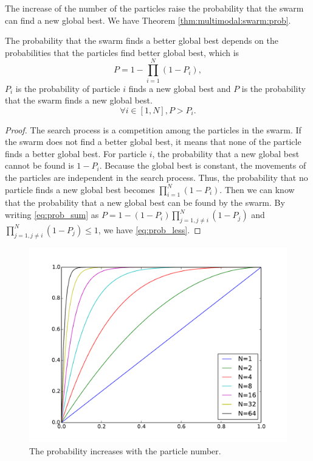 The increase of the number of the particles raise the probability that the swarm can find a new global best.
We have Theorem \ref{thm:multimodal:swarm:prob}.

\begin{mythm}
\label{thm:multimodal:swarm:prob}
The probability that the swarm finds a better global best depends on the probabilities that the particles find better global best, which is
\begin{equation}
\label{eq:prob_sum}
P = 1 - \prod_{i=1}^{N} ( 1 - P_{i} ),
\end{equation}
$ P_{i} $ is the probability of particle $ i $ finds a new global best
and $ P $ is the probability that the swarm finds a new global best.
\begin{equation}
\label{eq:prob_less}
\forall i \in [1, N], P > P_{i}.
\end{equation}
\begin{proof}
The search process is a competition among the particles in the swarm.
If the swarm does not find a better global best, it means that none of the particle finds a better global best.
For particle $ i $, the probability that a new global best cannot be found is $ 1 - P_{i} $.
Because the global best is constant, the movements of the particles are independent in the search process.
Thus, the probability that no particle finds a new global best becomes
$ \prod_{i=1}^{N} ( 1 - P_{i} ) $.
Then we can know that the probability that a new global best can be found by the swarm.
By writing \eqref{eq:prob_sum} as $ P = 1 - ( 1 - P_{i} ) \prod_{j=1, j \not = i}^{N}  ( 1 - P_{j} ) $ and $ \prod_{j=1, j \not = i}^{N}  ( 1 - P_{j} ) \leq 1 $,
we have \eqref{eq:prob_less}.
\end{proof}
\end{mythm}

\begin{figure}
\centering
\includegraphics[width=0.7\linewidth]{./fig/probRise}
\caption{The probability increases with the particle number.}
\label{fig:probRise}
\end{figure}

